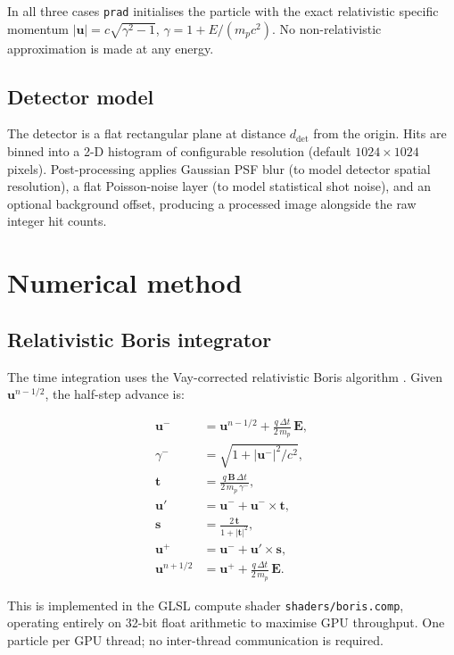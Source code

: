\documentclass[review,12pt]{elsarticle}
\begin{document}
In all three cases \texttt{prad} initialises the particle with the exact relativistic
specific momentum $|\mathbf{u}| = c\sqrt{\gamma^2 - 1}$, $\gamma = 1 + E/(m_p c^2)$.
No non-relativistic approximation is made at any energy.

\subsection{Detector model}

The detector is a flat rectangular plane at distance $d_\mathrm{det}$ from the origin.
Hits are binned into a 2-D histogram of configurable resolution (default $1024 \times 1024$
pixels). Post-processing applies Gaussian PSF blur (to model detector spatial resolution),
a flat Poisson-noise layer (to model statistical shot noise), and an optional background
offset, producing a processed image alongside the raw integer hit counts.

\section{Numerical method}
\label{sec:numerical}

\subsection{Relativistic Boris integrator}

The time integration uses the Vay-corrected relativistic Boris algorithm \cite{vay2008}.
Given $\mathbf{u}^{n-1/2}$, the half-step advance is:

\begin{align}
  \mathbf{u}^- &= \mathbf{u}^{n-1/2} + \frac{q\,\Delta t}{2\,m_p}\,\mathbf{E}, \\
  \gamma^- &= \sqrt{1 + |\mathbf{u}^-|^2/c^2}, \\
  \mathbf{t} &= \frac{q\,\mathbf{B}\,\Delta t}{2\,m_p\,\gamma^-}, \\
  \mathbf{u}' &= \mathbf{u}^- + \mathbf{u}^- \times \mathbf{t}, \\
  \mathbf{s} &= \frac{2\,\mathbf{t}}{1 + |\mathbf{t}|^2}, \\
  \mathbf{u}^+ &= \mathbf{u}^- + \mathbf{u}' \times \mathbf{s}, \\
  \mathbf{u}^{n+1/2} &= \mathbf{u}^+ + \frac{q\,\Delta t}{2\,m_p}\,\mathbf{E}.
\end{align}

This is implemented in the GLSL compute shader \texttt{shaders/boris.comp}, operating
entirely on 32-bit float arithmetic to maximise GPU throughput. One particle per GPU
thread; no inter-thread communication is required.
\end{document}
